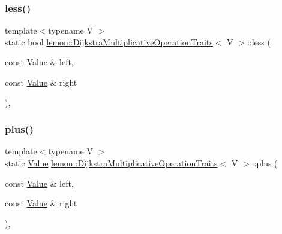 \subsubsection{\texorpdfstring{less()}{less()}}
{\footnotesize\ttfamily template$<$typename V $>$ \\
static bool \hyperlink{structlemon_1_1_dijkstra_multiplicative_operation_traits}{lemon\+::\+Dijkstra\+Multiplicative\+Operation\+Traits}$<$ V $>$\+::less (\begin{DoxyParamCaption}\item[{const \hyperlink{structlemon_1_1_dijkstra_multiplicative_operation_traits_a8832632b11125d59eedb238160bc1554}{Value} \&}]{left,  }\item[{const \hyperlink{structlemon_1_1_dijkstra_multiplicative_operation_traits_a8832632b11125d59eedb238160bc1554}{Value} \&}]{right }\end{DoxyParamCaption})\hspace{0.3cm}{\ttfamily [inline]}, {\ttfamily [static]}}

\mbox{\label{structlemon_1_1_dijkstra_multiplicative_operation_traits_a5b8190dbafe5ad4fa70098dcc876c183}} 
\subsubsection{\texorpdfstring{plus()}{plus()}}
{\footnotesize\ttfamily template$<$typename V $>$ \\
static \hyperlink{structlemon_1_1_dijkstra_multiplicative_operation_traits_a8832632b11125d59eedb238160bc1554}{Value} \hyperlink{structlemon_1_1_dijkstra_multiplicative_operation_traits}{lemon\+::\+Dijkstra\+Multiplicative\+Operation\+Traits}$<$ V $>$\+::plus (\begin{DoxyParamCaption}\item[{const \hyperlink{structlemon_1_1_dijkstra_multiplicative_operation_traits_a8832632b11125d59eedb238160bc1554}{Value} \&}]{left,  }\item[{const \hyperlink{structlemon_1_1_dijkstra_multiplicative_operation_traits_a8832632b11125d59eedb238160bc1554}{Value} \&}]{right }\end{DoxyParamCaption})\hspace{0.3cm}{\ttfamily [inline]}, {\ttfamily [static]}}


